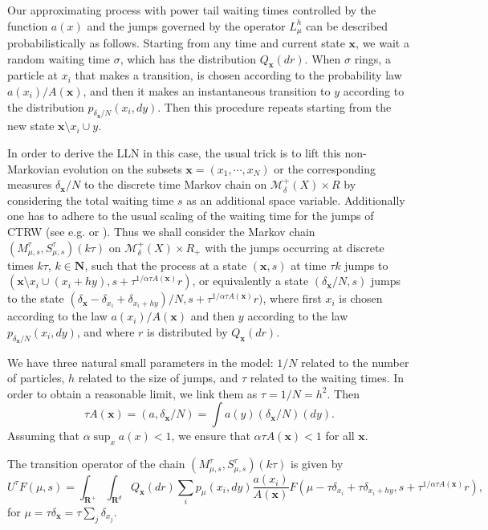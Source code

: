 \documentclass[12pt]{article}
\def\MC{\mathcal{M}}
\def\N{\mathbf{N}}
\def\R{\mathbf{R}}
\def\x{\mathbf{x}}
\def\al{\alpha}
\def\de{\delta}
\newcommand{\si}{\sigma}
\numberwithin{equation}{section}
\begin{document}
Our approximating process with power tail waiting times controlled by the function $a(x)$
and the jumps governed by the operator $L_{\mu}^h$ can be described probabilistically
as follows. Starting from any time and current state $\x$, we wait a
random waiting time $\si$, which has the distribution $Q_{\x}(dr)$.
When $\si$ rings, a particle at $x_i$ that makes a transition, is chosen
according to the probability law $a(x_i)/A(\x)$,
and then it makes an instantaneous transition to $y$
according to the distribution $p_{\de_{\x}/N}(x_i,dy)$.
 Then this procedure repeats starting from the new state
$\x\setminus x_i \cup y$.


In order to derive the LLN in this case, the usual trick is to lift
this non-Markovian evolution on the subsets $\x=(x_1, \cdots, x_N)$
or the corresponding measures $\de_{\x}/N$ to the
discrete time Markov chain on $\MC^+_{\delta}(X)\times R$
by considering the total waiting time $s$ as an additional space variable. Additionally
one has to adhere to the usual scaling of the waiting time for
the jumps of CTRW (see e.g. \cite{MS2} or \cite{Ko11}).
Thus we shall consider the Markov chain $(M^{\tau}_{\mu,s},S^{\tau}_{\mu,s})(k\tau)$
on $\MC^+_{\delta}(X)\times R_+$ with the jumps occurring at discrete times $k\tau$, $k\in \N$,
such that the process at a state $(\x,s)$ at time $\tau k$
jumps to $(\x \setminus x_i \cup (x_i+hy), s+\tau^{1/\al \tau A(\x)}r)$,
or equivalently a state $(\de_{\x}/N,s)$ jumps to the state
$(\de_{\x}-\de_{x_i}+\de_{x_i+hy})/N, s+\tau^{1/\al \tau A(\x)}r)$,
where first $x_i$ is chosen according to the law $a(x_i)/A(\x)$
and then $y$ according to the law $p_{\de_{\x}/N}(x_i, dy)$, and
where $r$ is distributed by $Q_{\x}(dr)$.


We have three natural small parameters in the model: $1/N$ related to the number of particles,
$h$ related to the size of jumps, and $\tau$ related to the waiting times. In order to obtain
a reasonable limit, we link them as $\tau=1/N=h^2$. Then
\[
\tau A(\x)=(a,\de_{\x}/N)=\int a(y) (\de_{\x}/N) (dy).
\]
Assuming that $\al \sup_x a(x) <1$, we ensure that $\al \tau A(\x)<1$ for all $\x$.

The  transition operator of the chain $(M^{\tau}_{\mu,s},S^{\tau}_{\mu,s})(k\tau)$ is given by
\begin{equation}
\label{transprobmfMCtot2}
U^{\tau}F(\mu,s)=\int_{\R^+} \int_{\R^d} Q_{\x}(dr)\sum_i p_{\mu}(x_i, dy)\frac{a(x_i)}{A(\x)}
F\left(\mu-\tau\de_{x_i}+\tau\de_{x_i+hy}, s+\tau^{1/\al \tau A(\x)}r\right),
\end{equation}
for $\mu=\tau\de_{\x}=\tau\sum_j \de_{x_j}$.
\end{document}
